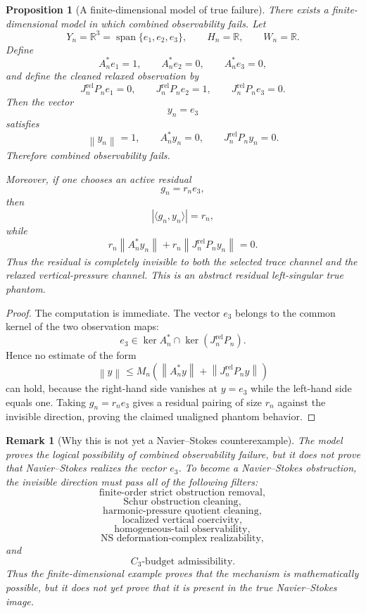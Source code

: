 \documentclass[11pt]{article}
\numberwithin{equation}{section}
\newtheorem{proposition}[theorem]{Proposition}
\newtheorem{remark}[theorem]{Remark}
\newcommand{\norm}[2]{\left\|#1\right\|_{#2}}
\begin{document}
\begin{proposition}[A finite-dimensional model of true failure]
There exists a finite-dimensional model in which combined observability fails. Let
\[
Y_n=\mathbb R^3
=
\operatorname{span}\{e_1,e_2,e_3\},
\qquad
H_n=\mathbb R,
\qquad
W_n=\mathbb R.
\]
Define
\[
A_n^*e_1=1,
\qquad
A_n^*e_2=0,
\qquad
A_n^*e_3=0,
\]
and define the cleaned relaxed observation by
\[
J_n^{\mathrm{rel}}P_ne_1=0,
\qquad
J_n^{\mathrm{rel}}P_ne_2=1,
\qquad
J_n^{\mathrm{rel}}P_ne_3=0.
\]
Then the vector
\[
y_n=e_3
\]
satisfies
\[
\norm{y_n}{}=1,
\qquad
A_n^*y_n=0,
\qquad
J_n^{\mathrm{rel}}P_ny_n=0.
\]
Therefore combined observability fails.

Moreover, if one chooses an active residual
\[
g_n=r_ne_3,
\]
then
\[
|\langle g_n,y_n\rangle|=r_n,
\]
while
\[
r_n\norm{A_n^*y_n}{}
+
r_n\norm{J_n^{\mathrm{rel}}P_ny_n}{}
=0.
\]
Thus the residual is completely invisible to both the selected trace channel and the relaxed vertical-pressure channel. This is an abstract residual left-singular true phantom.
\end{proposition}

\begin{proof}
The computation is immediate. The vector \(e_3\) belongs to the common kernel of the two observation maps:
\[
e_3\in \ker A_n^*
\cap
\ker(J_n^{\mathrm{rel}}P_n).
\]
Hence no estimate of the form
\[
\norm{y}{}
\le
M_n\left(\norm{A_n^*y}{}+\norm{J_n^{\mathrm{rel}}P_ny}{}\right)
\]
can hold, because the right-hand side vanishes at \(y=e_3\) while the left-hand side equals one. Taking \(g_n=r_ne_3\) gives a residual pairing of size \(r_n\) against the invisible direction, proving the claimed unaligned phantom behavior.
\end{proof}

\begin{remark}[Why this is not yet a Navier--Stokes counterexample]
The model proves the logical possibility of combined observability failure, but it does not prove that Navier--Stokes realizes the vector \(e_3\). To become a Navier--Stokes obstruction, the invisible direction must pass all of the following filters:
\[
\text{finite-order strict obstruction removal},
\]
\[
\text{Schur obstruction cleaning},
\]
\[
\text{harmonic-pressure quotient cleaning},
\]
\[
\text{localized vertical coercivity},
\]
\[
\text{homogeneous-tail observability},
\]
\[
\text{NS deformation-complex realizability},
\]
and
\[
C_3\text{-budget admissibility}.
\]
Thus the finite-dimensional example proves that the mechanism is mathematically possible, but it does not yet prove that it is present in the true Navier--Stokes image.
\end{remark}
\end{document}
